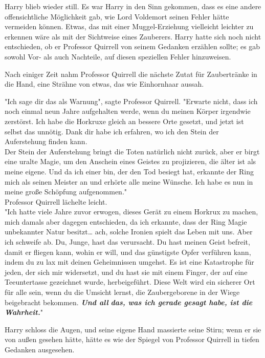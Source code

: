 {Harry blieb wieder still. Es war Harry in den Sinn gekommen, dass es eine andere offensichtliche Möglichkeit gab, wie Lord Voldemort seinen Fehler hätte vermeiden können. Etwas, das mit einer Muggel-Erziehung vielleicht leichter zu erkennen wäre als mit der Sichtweise eines Zauberers. Harry hatte sich noch nicht entschieden, ob er Professor Quirrell von seinem Gedanken erzählen sollte; es gab sowohl Vor- als auch Nachteile, auf diesen speziellen Fehler hinzuweisen.

Nach einiger Zeit nahm Professor Quirrell die nächste Zutat für Zaubertränke in die Hand, eine Strähne von etwas, das wie Einhornhaar aussah.

"Ich sage dir das als Warnung", sagte Professor Quirrell. "Erwarte nicht, dass ich noch einmal neun Jahre aufgehalten werde, wenn du meinen Körper irgendwie zerstörst. Ich habe die Horkruxe gleich an bessere Orte gesetzt, und jetzt ist selbst das unnötig. Dank dir habe ich erfahren, wo ich den Stein der Auferstehung finden kann.\\ Der Stein der Auferstehung bringt die Toten natürlich nicht zurück, aber er birgt eine uralte Magie, um den Anschein eines Geistes zu projizieren, die älter ist als meine eigene. Und da ich einer bin, der den Tod besiegt hat, erkannte der Ring mich als seinen Meister an und erhörte alle meine Wünsche. Ich habe es nun in meine große Schöpfung aufgenommen."\\ Professor Quirrell lächelte leicht.\\ "Ich hatte viele Jahre zuvor erwogen, dieses Gerät zu einem Horkrux zu machen, mich damals aber dagegen entschieden, da ich erkannte, dass der Ring Magie unbekannter Natur besitzt… ach, solche Ironien spielt das Leben mit uns. Aber ich schweife ab. Du, Junge, hast das verursacht. Du hast meinen Geist befreit, damit er fliegen kann, wohin er will, und das günstigste Opfer verführen kann, indem du zu lax mit deinen Geheimnissen umgehst. Es ist eine Katastrophe für jeden, der sich mir widersetzt, und du hast sie mit einem Finger, der auf eine Teeuntertasse gezeichnet wurde, herbeigeführt. Diese Welt wird ein sicherer Ort für alle sein, wenn du die Umsicht lernst, die Zaubergeborene in der Wiege beigebracht bekommen. \textbf{\emph{Und all}} \textbf{\emph{das, was ich gerade gesagt habe, ist die Wahrheit.}}"

Harry schloss die Augen, und seine eigene Hand massierte seine Stirn; wenn er sie von außen gesehen hätte, hätte es wie der Spiegel von Professor Quirrell in tiefen Gedanken ausgesehen.

}
